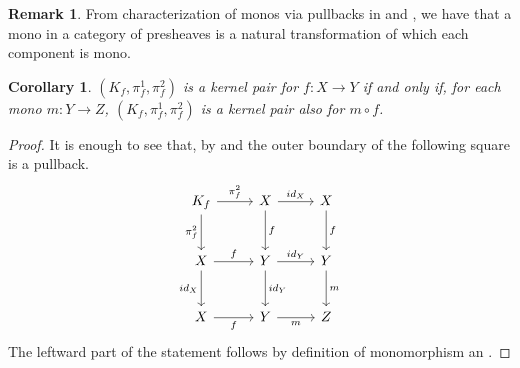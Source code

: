 \documentclass[runningheads,envcountsect]{llncs}
\theoremstyle{plain}
\newtheorem{cor}[theorem]{Corollary}
\theoremstyle{definition}
\newtheorem{remark}[theorem]{Remark}
\begin{document}
\begin{remark}\label{rem:monos_in_presh_cats}
    From characterization of monos via pullbacks in  and , we have that a mono in a category of presheaves is a natural transformation of which each component is mono.
\end{remark}

\begin{cor}\label{cor:kermono}
	$(K_f, \pi_f^1, \pi_f^2)$ is a kernel pair for $f\colon X\to Y$ if and only if, for each mono $m\colon Y\to Z$, $(K_f, \pi_f^1, \pi_f^2)$ is a kernel pair also for $m\circ f$.
\end{cor}
\begin{proof}
    It is enough to see that, by  and  the outer boundary of the following square is a pullback.
        \[\begin{tikzcd}[row sep=13 pt, column sep=13 pt]
    	{K_f} && X && X \\
    	\\
    	X && Y && Y \\
    	\\
    	X && Y && Z
    	\arrow["{\pi_f^2}", from=1-1, to=1-3]
    	\arrow["{\pi_f^2}"', from=1-1, to=3-1]
    	\arrow["{id_X}", from=1-3, to=1-5]
    	\arrow["f", from=1-3, to=3-3]
    	\arrow["f", from=1-5, to=3-5]
    	\arrow["f", from=3-1, to=3-3]
    	\arrow["{id_X}"', from=3-1, to=5-1]
    	\arrow["{id_Y}", from=3-3, to=3-5]
    	\arrow["{id_Y}", from=3-3, to=5-3]
    	\arrow["m", from=3-5, to=5-5]
    	\arrow["f"', from=5-1, to=5-3]
    	\arrow["m"', from=5-3, to=5-5]
    \end{tikzcd}\]
    The leftward part of the statement follows by definition of monomorphism an .
\end{proof}
\end{document}
